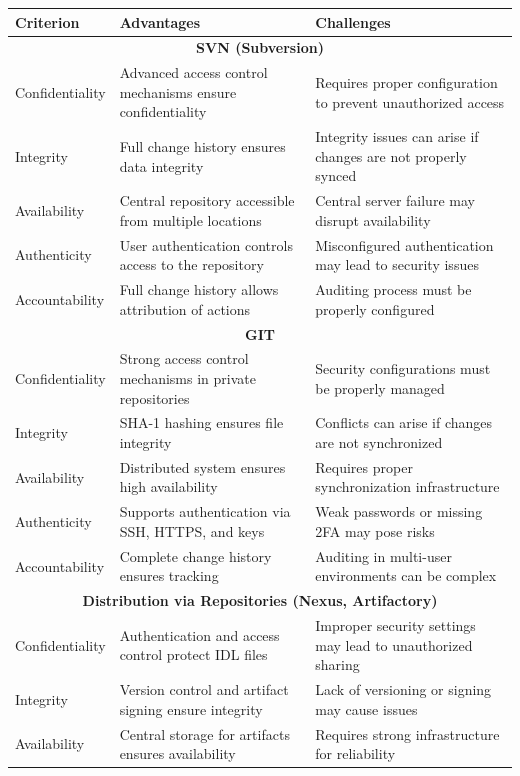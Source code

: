 \documentclass[runningheads,12pt]{llncs}
\begin{document}
\begin{longtable}{|p{4cm}|p{4cm}|p{4cm}|}
\hline
\textbf{Criterion} & \textbf{Advantages} & \textbf{Challenges} \\ \hline
\multicolumn{3}{|c|}{\textbf{SVN (Subversion)}} \\ \hline
Confidentiality & Advanced access control mechanisms ensure confidentiality & Requires proper configuration to prevent unauthorized access \\ \hline
Integrity & Full change history ensures data integrity & Integrity issues can arise if changes are not properly synced \\ \hline
Availability & Central repository accessible from multiple locations & Central server failure may disrupt availability \\ \hline
Authenticity & User authentication controls access to the repository & Misconfigured authentication may lead to security issues \\ \hline
Accountability & Full change history allows attribution of actions & Auditing process must be properly configured \\ \hline
\multicolumn{3}{|c|}{\textbf{GIT}} \\ \hline
Confidentiality & Strong access control mechanisms in private repositories & Security configurations must be properly managed \\ \hline
Integrity & SHA-1 hashing ensures file integrity & Conflicts can arise if changes are not synchronized \\ \hline
Availability & Distributed system ensures high availability & Requires proper synchronization infrastructure \\ \hline
Authenticity & Supports authentication via SSH, HTTPS, and keys & Weak passwords or missing 2FA may pose risks \\ \hline
Accountability & Complete change history ensures tracking & Auditing in multi-user environments can be complex \\ \hline
\multicolumn{3}{|c|}{\textbf{Distribution via Repositories (Nexus, Artifactory)}} \\ \hline
Confidentiality & Authentication and access control protect IDL files & Improper security settings may lead to unauthorized sharing \\ \hline
Integrity & Version control and artifact signing ensure integrity & Lack of versioning or signing may cause issues \\ \hline
Availability & Central storage for artifacts ensures availability & Requires strong infrastructure for reliability \\ \hline

\end{longtable}
\end{document}
